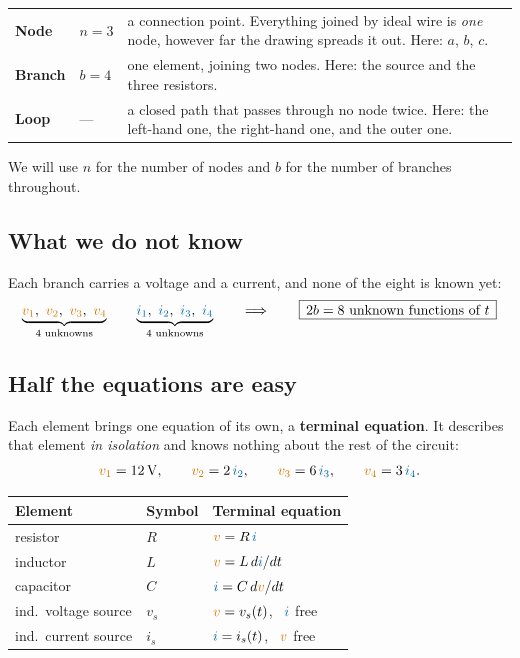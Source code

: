 \documentclass[11pt,a4paper]{article}
\newcommand{\Icol}[1]{\textcolor{ccur}{#1}}
\newcommand{\Vcol}[1]{\textcolor{cvolt}{#1}}
\begin{document}
\begin{center}
\small
\begin{tabular}{@{}l l p{10.4cm}@{}}
\toprule
\textbf{Node}   & $n = 3$ & a connection point. Everything joined by ideal wire is
                  \emph{one} node, however far the drawing spreads it out.
                  Here: $a$, $b$, $c$.\\
\textbf{Branch} & $b = 4$ & one element, joining two nodes. Here: the source and the three
                  resistors.\\
\textbf{Loop}   & --- & a closed path that passes through no node twice. Here: the
                  left-hand one, the right-hand one, and the outer one.\\
\bottomrule
\end{tabular}
\end{center}

We will use $n$ for the number of nodes and $b$ for the number of branches throughout.

\subsection{What we do not know}
Each branch carries a \Vcol{voltage} and a \Icol{current}, and none of the eight is
known yet:
\[
  \underbrace{\Vcol{v_1},\ \Vcol{v_2},\ \Vcol{v_3},\ \Vcol{v_4}}_{\text{4 unknowns}}
  \qquad
  \underbrace{\Icol{i_1},\ \Icol{i_2},\ \Icol{i_3},\ \Icol{i_4}}_{\text{4 unknowns}}
  \qquad\Longrightarrow\qquad
  \boxed{\,2b = 8 \text{ unknown functions of } t\,}
\]

\subsection{Half the equations are easy}

Each element brings one equation of its own, a \textbf{terminal equation}. It describes
that element \emph{in isolation} and knows nothing about the rest of the circuit:
\[
  \Vcol{v_1} = 12\V, \qquad
  \Vcol{v_2} = 2\,\Icol{i_2}, \qquad
  \Vcol{v_3} = 6\,\Icol{i_3}, \qquad
  \Vcol{v_4} = 3\,\Icol{i_4} .
\]

\begin{center}
\small
\begin{tabular}{@{}l l l@{}}
\toprule
\textbf{Element} & \textbf{Symbol} & \textbf{Terminal equation}\\
\midrule
resistor             & $R$   & $\Vcol{v} = R\,\Icol{i}$\\
inductor             & $L$   & $\Vcol{v} = L\,d\Icol{i}/dt$\\
capacitor            & $C$   & $\Icol{i} = C\,d\Vcol{v}/dt$\\
ind.\ voltage source & $v_s$ & $\Vcol{v} = v_s(t)$, \ $\Icol{i}$ free\\
ind.\ current source & $i_s$ & $\Icol{i} = i_s(t)$, \ $\Vcol{v}$ free\\
\bottomrule
\end{tabular}
\end{center}
\end{document}

